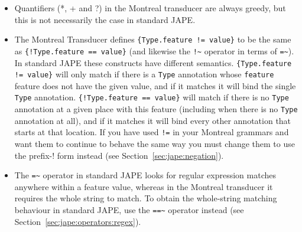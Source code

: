 \begin{itemize}
\item Quantifiers (*, + and ?) in the Montreal transducer are always greedy,
      but this is not necessarily the case in standard JAPE.
\item The Montreal Transducer defines \verb|{Type.feature != value}| to be the
      same as \verb|{!Type.feature == value}| (and likewise the \verb|!~|
      operator in terms of \verb|=~|).  In standard JAPE these constructs have
      different semantics.  \verb|{Type.feature != value}| will only match if
      there is a \verb|Type| annotation whose \verb|feature| feature does not
      have the given value, and if it matches it will bind the single
      \verb|Type| annotation.  \verb|{!Type.feature == value}| will match if
      there is no \verb|Type| annotation at a given place with this feature
      (including when there is no \verb|Type| annotation at all), and if it
      matches it will bind every other annotation that starts at that location.
      If you have used \verb|!=| in your Montreal grammars and want them to
      continue to behave the same way you must change them to use the prefix-!
      form instead (see Section~\ref{sec:jape:negation}).
\item The \verb|=~| operator in standard JAPE looks for regular expression
      matches anywhere within a feature value, whereas in the Montreal
      transducer it requires the whole string to match.  To obtain the
      whole-string matching behaviour in standard JAPE, use the \verb|==~|
      operator instead (see Section~\ref{sec:jape:operators:regex}).
\end{itemize}

